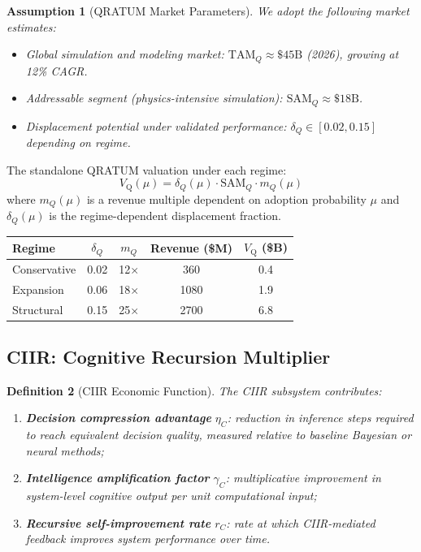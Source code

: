 \documentclass[11pt,a4paper]{article}
\newtheorem{definition}{Definition}[section]
\newtheorem{assumption}[definition]{Assumption}
\theoremstyle{remark}
\newcommand{\VQ}{V_{\mathrm{Q}}}
\newcommand{\TAM}{\mathrm{TAM}}
\newcommand{\SAM}{\mathrm{SAM}}
\begin{document}
\begin{assumption}[QRATUM Market Parameters]
\label{ass:qratum_market}
We adopt the following market estimates:
\begin{itemize}[nosep]
  \item Global simulation and modeling market:
        $\TAM_Q \approx \$45\text{B}$ (2026), growing at 12\% CAGR.
  \item Addressable segment (physics-intensive simulation):
        $\SAM_Q \approx \$18\text{B}$.
  \item Displacement potential under validated performance:
        $\delta_Q \in [0.02, 0.15]$ depending on regime.
\end{itemize}
\end{assumption}

The standalone QRATUM valuation under each regime:
\begin{equation}
  \VQ(\mu) = \delta_Q(\mu) \cdot \SAM_Q \cdot m_Q(\mu)
  \label{eq:vq}
\end{equation}
where $m_Q(\mu)$ is a revenue multiple dependent on adoption
probability $\mu$ and $\delta_Q(\mu)$ is the regime-dependent
displacement fraction.

\begin{center}
\renewcommand{\arraystretch}{1.2}
\begin{tabular}{lcccc}
\toprule
\textbf{Regime} & $\delta_Q$ & $m_Q$ & \textbf{Revenue (\$M)} & $\VQ$ \textbf{(\$B)} \\
\midrule
Conservative & 0.02 & 12$\times$ & 360  & 0.4  \\
Expansion    & 0.06 & 18$\times$ & 1080 & 1.9  \\
Structural   & 0.15 & 25$\times$ & 2700 & 6.8  \\
\bottomrule
\end{tabular}
\end{center}

\subsection{CIIR: Cognitive Recursion Multiplier}
\label{subsec:ciir}

\begin{definition}[CIIR Economic Function]
\label{def:ciir_econ}
The CIIR subsystem contributes:
\begin{enumerate}[nosep]
  \item \textbf{Decision compression advantage} $\eta_C$: reduction
        in inference steps required to reach equivalent decision quality,
        measured relative to baseline Bayesian or neural methods;
  \item \textbf{Intelligence amplification factor} $\gamma_C$:
        multiplicative improvement in system-level cognitive output per
        unit computational input;
  \item \textbf{Recursive self-improvement rate} $r_C$: rate at which
        CIIR-mediated feedback improves system performance over time.
\end{enumerate}
\end{definition}
\end{document}
